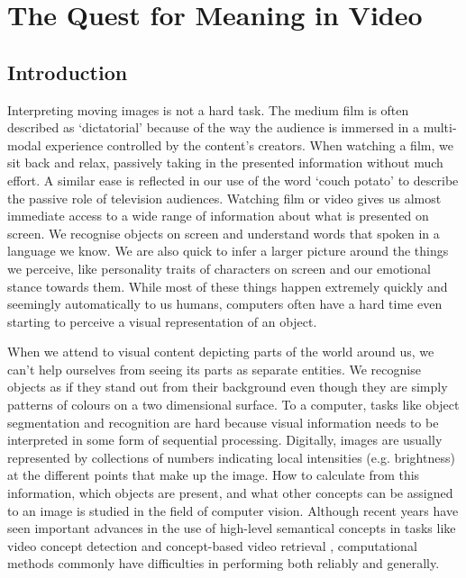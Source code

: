 \chapter{The Quest for Meaning in Video}
\label{ch:quest}

\section{Introduction} %
\label{sec:introduction}

Interpreting moving images is not a hard task. The medium film is often described as `dictatorial' because of the way the audience is immersed in a multi-modal experience controlled by the content's creators. When watching a film, we sit back and relax, passively taking in the presented information without much effort. A similar ease is reflected in our use of the word `couch potato' to describe the passive role of television audiences. Watching film or video gives us almost immediate access to a wide range of information about what is presented on screen. We recognise objects on screen and understand words that spoken in a language we know. We are also quick to infer a larger picture around the things we perceive, like personality traits of characters on screen and our emotional stance towards them. While most of these things happen extremely quickly and seemingly automatically to us humans, computers often have a hard time even starting to perceive a visual representation of an object.

When we attend to visual content depicting parts of the world around us, we can't help ourselves from seeing its parts as separate entities. We recognise objects as if they stand out from their background even though they are simply patterns of colours on a two dimensional surface. To a computer, tasks like object segmentation and recognition are hard because visual information needs to be interpreted in some form of sequential processing. Digitally, images are usually represented by collections of numbers indicating local intensities (e.g. brightness) at the different points that make up the image. How to calculate from this information, which objects are present, and what other concepts can be assigned to an image is studied in the field of computer vision. Although recent years have seen important advances in the use of high-level semantical concepts in tasks like video concept detection and concept-based video retrieval \cite{Snoek:2009dq, Snoek:jf, Worring:2007vm, Chang:2008wh}, computational methods commonly have difficulties in performing both reliably and generally.

